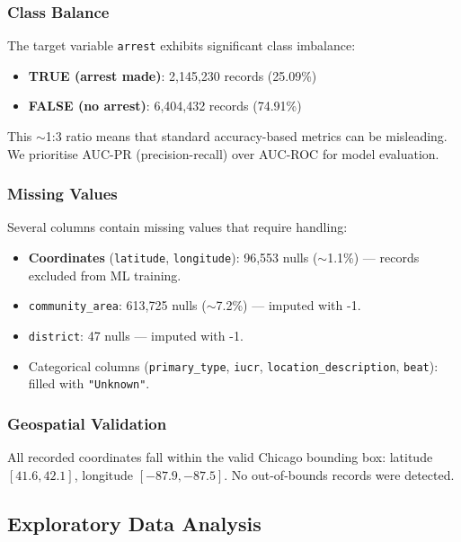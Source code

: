 \subsubsection{Class Balance}

The target variable \texttt{arrest} exhibits significant class imbalance:

\begin{itemize}
    \item \textbf{TRUE (arrest made)}: 2,145,230 records (25.09\%)
    \item \textbf{FALSE (no arrest)}: 6,404,432 records (74.91\%)
\end{itemize}

This $\sim$1:3 ratio means that standard accuracy-based metrics can be misleading. We prioritise AUC-PR (precision-recall) over AUC-ROC for model evaluation.

\subsubsection{Missing Values}

Several columns contain missing values that require handling:

\begin{itemize}
    \item \textbf{Coordinates} (\texttt{latitude}, \texttt{longitude}): 96,553 nulls ($\sim$1.1\%) — records excluded from ML training.
    \item \texttt{community\_area}: 613,725 nulls ($\sim$7.2\%) — imputed with -1.
    \item \texttt{district}: 47 nulls — imputed with -1.
    \item Categorical columns (\texttt{primary\_type}, \texttt{iucr}, \texttt{location\_description}, \texttt{beat}): filled with \texttt{"Unknown"}.
\end{itemize}

\subsubsection{Geospatial Validation}

All recorded coordinates fall within the valid Chicago bounding box: latitude $[41.6, 42.1]$, longitude $[-87.9, -87.5]$. No out-of-bounds records were detected.

\subsection{Exploratory Data Analysis}

